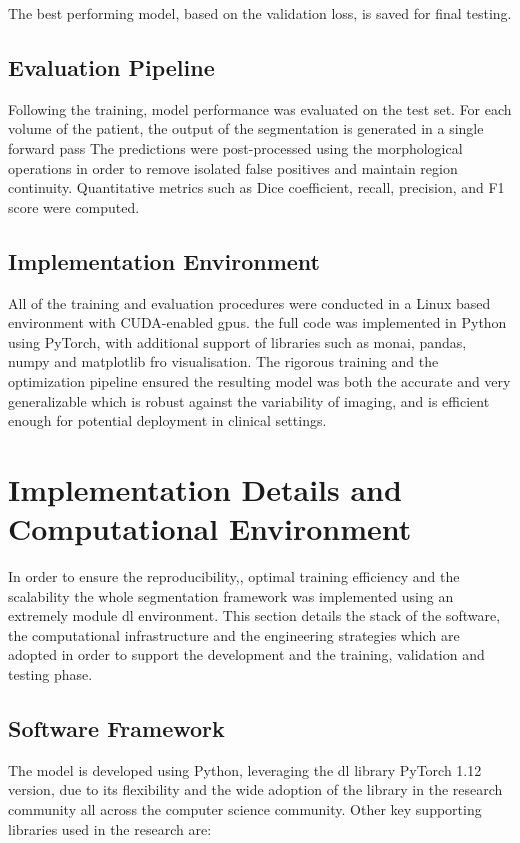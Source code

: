 The best performing model, based on the validation loss, is saved for final testing.

\subsection{Evaluation Pipeline}
Following the training, model performance was evaluated on the test set. For each volume of the patient, the output of the segmentation is generated in a single forward pass The predictions were post-processed using the morphological operations in order to remove isolated false positives and maintain region continuity. Quantitative metrics such as Dice coefficient, recall, precision, and F1 score were computed.

\subsection{Implementation Environment}
All of the training and evaluation procedures were conducted in a Linux based environment with CUDA-enabled \gls{gpu}s. the full code was implemented in Python using PyTorch, with additional support of libraries such as monai, pandas, numpy and matplotlib fro visualisation. The rigorous training and the optimization pipeline ensured the resulting model was both the accurate and very generalizable which is robust against the variability of imaging, and is efficient enough for potential deployment in clinical settings.

\section{Implementation Details and Computational Environment}

In order to ensure the reproducibility,, optimal training efficiency and the scalability the whole segmentation framework was implemented using an extremely module \gls{dl} environment. This section details the stack of the software, the computational infrastructure and the engineering strategies which are adopted in order to support the development and the training, validation and testing phase.

\subsection{Software Framework}
The model is developed using Python, leveraging the \gls{dl} library PyTorch 1.12 version, due to its flexibility and the wide adoption of the library in the research community all across the computer science community. Other key supporting libraries used in the research are:

